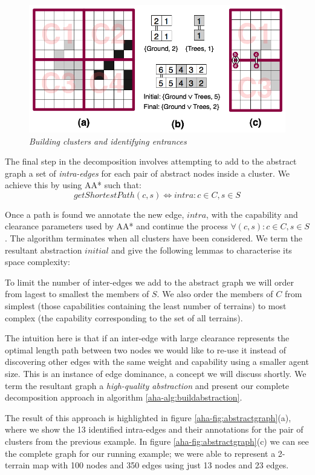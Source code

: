 {\begin{figure}[htbp]
        \caption{\emph{Building clusters and identifying entrances} }
        \begin{center}
                        \includegraphics[scale=0.25]{diagrams/identifying_entrances.png}
        \end{center}
        \label{aha-fig:clustersandentrances}
\end{figure}

The final step in the decomposition involves attempting to add to the abstract graph a set of \emph{intra-edges} for each pair of abstract nodes inside a cluster. We achieve this by using AA* such that:
$$ getShortestPath(c, s) \Leftrightarrow intra : c \in C, s \in S $$
\par \indent
Once a path is found we annotate the new edge, $intra$, with the capability and clearance parameters used by AA* and continue the process $\forall (c, s) : c \in C, s \in S$. The algorithm terminates when all clusters have been considered. 
We term the resultant abstraction $initial$ and give the following lemmas to characterise its space complexity:




To limit the number of inter-edges we add to the abstract graph we will order from lagest to smallest the members of $S$. 
We also order the members of $C$ from simplest (those capabilities containing the least number of terrains) to most complex (the capability corresponding to the set of all terrains). 
\par \indent
The intuition here is that if an inter-edge with large clearance represents the optimal length path between two nodes we would like to re-use it instead of discovering other edges with the same weight and capability using a smaller agent size. This is an instance of edge dominance, a concept we will discuss shortly.
We term the resultant graph a \emph{high-quality abstraction} and present our complete decomposition approach in  algorithm \ref{aha-alg:buildabstraction}.
\par \indent
The result of this approach is highlighted in figure \ref{aha-fig:abstractgraph}(a), where we show the 13 identified intra-edges and their annotations for the pair of clusters from the previous example. In figure \ref{aha-fig:abstractgraph}(c) we can see the complete graph for our running example; we were able to represent a 2-terrain map with 100 nodes and 350 edges using just 13 nodes and  23 edges. 

}
